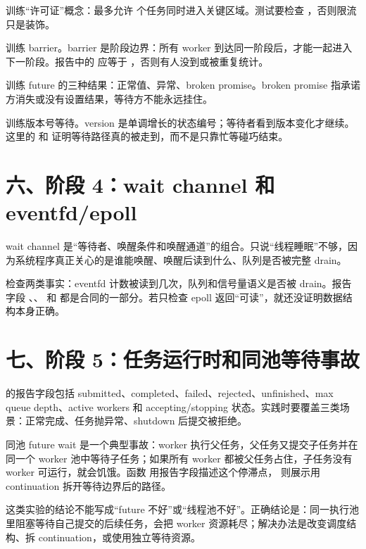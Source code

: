  训练“许可证”概念：最多允许  个任务同时进入关键区域。测试要检查 ，否则限流只是装饰。

 训练 barrier。barrier 是阶段边界：所有 worker 到达同一阶段后，才能一起进入下一阶段。报告中的  应等于 ，否则有人没到或被重复统计。

 训练 future 的三种结果：正常值、异常、broken promise。broken promise 指承诺方消失或没有设置结果，等待方不能永远挂住。

 训练版本号等待。version 是单调增长的状态编号；等待者看到版本变化才继续。这里的  和  证明等待路径真的被走到，而不是只靠忙等碰巧结束。

\section{六、阶段 4：wait channel 和 eventfd/epoll}

wait channel 是“等待者、唤醒条件和唤醒通道”的组合。只说“线程睡眠”不够，因为系统程序真正关心的是谁能唤醒、唤醒后读到什么、队列是否被完整 drain。

 检查两类事实：eventfd 计数被读到几次，队列和信号量语义是否被 drain。报告字段 、、 和  都是合同的一部分。若只检查 epoll 返回“可读”，就还没证明数据结构本身正确。

\section{七、阶段 5：任务运行时和同池等待事故}

 的报告字段包括 submitted、completed、failed、rejected、unfinished、max queue depth、active workers 和 accepting/stopping 状态。实践时要覆盖三类场景：正常完成、任务抛异常、shutdown 后提交被拒绝。

同池 future wait 是一个典型事故：worker 执行父任务，父任务又提交子任务并在同一个 worker 池中等待子任务；如果所有 worker 都被父任务占住，子任务没有 worker 可运行，就会饥饿。函数  用报告字段描述这个停滞点， 则展示用 continuation 拆开等待边界后的路径。

这类实验的结论不能写成“future 不好”或“线程池不好”。正确结论是：同一执行池里阻塞等待自己提交的后续任务，会把 worker 资源耗尽；解决办法是改变调度结构、拆 continuation，或使用独立等待资源。

